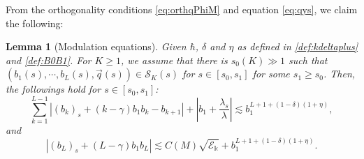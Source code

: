 \documentclass[11pt]{aims}
\newtheorem{lemma}[theorem]{Lemma}
\theoremstyle{definition}
\numberwithin{equation}{section}
\begin{document}
From the orthogonality conditions \eqref{eq:orthqPhiM} and equation \eqref{eq:qys}, we claim the following:
\begin{lemma}[Modulation equations] \label{lemm:mod1}  Given $\hbar$, $\delta$ and $\eta$ as defined in \eqref{def:kdeltaplus} and \eqref{def:B0B1}. For $K \geq 1$, we assume that there is $s_0(K) \gg 1$ such that $(b_1(s), \cdots, b_L(s), \vec q(s)) \in {\mathcal{S}}_K(s)$ for $s \in [s_0, s_1]$ for some $s_1 \geq s_0$. Then, the followings hold for $s \in [s_0, s_1]$:
\begin{equation}\label{eq:ODEbkl}
\sum_{k = 1}^{L-1}\left|(b_k)_s + (k - \gamma)b_1b_k - b_{k+1} \right| + \left|b_1 + \frac{\lambda_s}{\lambda}\right| \lesssim b_1^{L + 1 + (1 - \delta)(1 + \eta)},
\end{equation}
and 
\begin{equation}\label{eq:ODEbL}
\left|(b_L)_s + (L - \gamma)b_1b_L \right| \lesssim  C(M)\sqrt{{\mathscr{E}}_{\Bbbk}} + b_1^{L + 1+ (1 - \delta)(1 + \eta)}.
\end{equation}
\end{lemma}
\end{document}
